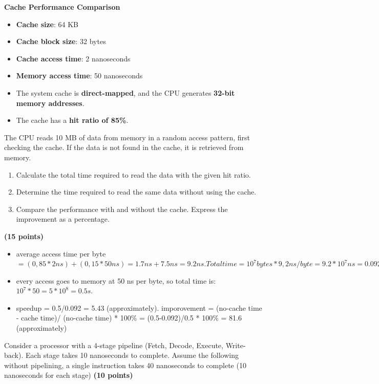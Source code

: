 \documentclass[10pt,answers]{exam}
\newcommand{\qpoints}[1]{\hfill \textbf{(#1 points)}}
\begin{document}
\begin{questions}
\question \textbf{Cache Performance Comparison} \begin{itemize}
    \item \textbf{Cache size}: 64 KB
    \item \textbf{Cache block size}: 32 bytes
    \item \textbf{Cache access time}: 2 nanoseconds
    \item \textbf{Memory access time}: 50 nanoseconds
    \item The system cache is \textbf{direct-mapped}, and the CPU generates \textbf{32-bit memory addresses}. 
    \item The cache has a \textbf{hit ratio of 85\%}.
\end{itemize}

The CPU reads 10 MB of data from memory in a random access pattern, first checking the cache. If the data is not found in the cache, it is retrieved from memory.

\begin{enumerate}[label=\arabic*.]
    \item Calculate the total time required to read the data with the given hit ratio.
    \item Determine the time required to read the same data without using the cache.    
    \item Compare the performance with and without the cache. Express the improvement as a percentage.
\end{enumerate} \qpoints{15}

\begin{solution}
	\begin{itemize}
    \item average access time per byte $= (0,85 * 2 ns) + (0,15 * 50 ns) = 1.7 ns + 7.5 ns = 9.2 ns. Total time = 10^7 bytes * 9,2 ns/byte = 9.2 * 10^7 ns = 0.092 s.$
    \item every access goes to memory at 50 ns per byte, so total time is: $10^7 * 50 = 5 * 10^8 = 0.5 s.$
    \item speedup = 0.5/0.092 = 5.43 (approximately). imporovement = (no-cache time - cache time)/ (no-cache time) * 100\% = (0.5-0.092)/0.5 * 100\% = 81.6 (approximately)
\end{itemize}
\end{solution}

\question Consider a processor with a 4-stage pipeline (Fetch, Decode, Execute, Write-back).  Each stage takes 10 nanoseconds to complete. Assume the following without  pipelining, a single instruction takes 40 nanoseconds to complete (10 nanoseconds for each stage) \qpoints{10}


\end{questions}
\end{document}
